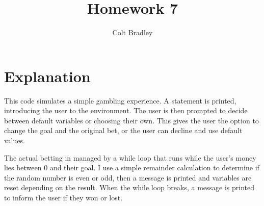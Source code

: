 \documentclass[11pt]{article}
\begin{document}
\title{Homework 7}
\author{Colt Bradley}
\date{}

\maketitle

\section{Explanation}
This code simulates a simple gambling experience. A statement is printed, introducing the user to the environment. The user is then prompted to decide between default variables or choosing their own. This gives the user the option to change the goal and the original bet, or the user can decline and use default values. 

The actual betting in managed by a while loop that runs while the user's money lies between 0 and their goal. I use a simple remainder calculation to determine if the random number is even or odd, then a message is printed and variables are reset depending on the result. When the while loop breaks, a message is printed to inform the user if they won or lost. 
\end{document}
